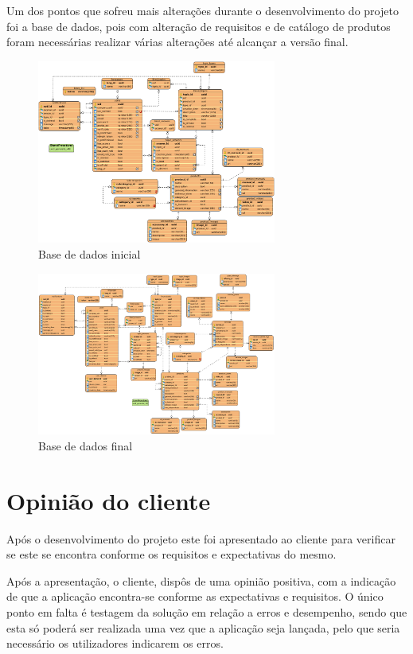 Um dos pontos que sofreu mais alterações durante o desenvolvimento do projeto foi a base de dados, pois com alteração de requisitos e de catálogo de produtos foram necessárias realizar várias alterações até alcançar a versão final.

\begin{figure}[htb]
  \centering
  \includegraphics[width=0.7\textwidth]{images/diagramas/diagrama_bd.png}
  \caption{Base de dados inicial}
  \label{fig:79}
\end{figure}

\begin{figure}[htb]
  \centering
  \includegraphics[width=0.7\textwidth]{images/diagramas/bd_final.png}
  \caption{Base de dados final}
  \label{fig:80}
\end{figure}

\section{Opinião do cliente}

Após o desenvolvimento do projeto este foi apresentado ao cliente para verificar se este se encontra conforme os requisitos e expectativas do mesmo.

Após a apresentação, o cliente, dispôs de uma opinião positiva, com a indicação de que a aplicação encontra-se conforme as expectativas e requisitos. O único ponto em falta é testagem da solução em relação a erros e desempenho, sendo que esta só poderá ser realizada uma vez que a aplicação seja lançada, pelo que seria necessário os utilizadores indicarem os erros.